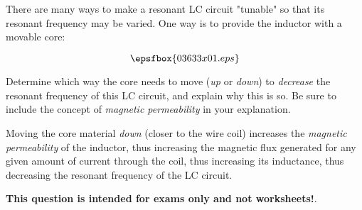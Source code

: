

There are many ways to make a resonant LC circuit "tunable" so that its resonant frequency may be varied.  One way is to provide the inductor with a movable core:

$$\epsfbox{03633x01.eps}$$

Determine which way the core needs to move ({\it up} or {\it down}) to {\it decrease} the resonant frequency of this LC circuit, and explain why this is so.  Be sure to include the concept of {\it magnetic permeability} in your explanation.







Moving the core material {\it down} (closer to the wire coil) increases the {\it magnetic permeability} of the inductor, thus increasing the magnetic flux generated for any given amount of current through the coil, thus increasing its inductance, thus decreasing the resonant frequency of the LC circuit.







{\bf This question is intended for exams only and not worksheets!}.



